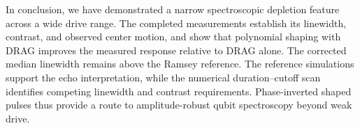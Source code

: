 \par
In conclusion, we have demonstrated a narrow spectroscopic depletion feature
across a wide drive range. The completed measurements establish its
linewidth, contrast, and observed center motion, and show that polynomial
shaping with DRAG improves the measured response relative to DRAG alone.
The corrected median linewidth remains above the Ramsey reference.
The reference simulations support the echo interpretation, while the
numerical duration--cutoff scan identifies competing linewidth and
contrast requirements. Phase-inverted shaped pulses thus provide a route
to amplitude-robust qubit spectroscopy beyond weak drive.

